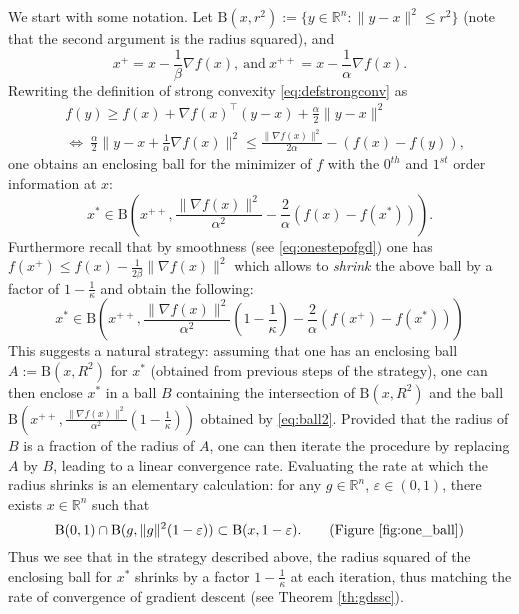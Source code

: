 \documentclass[openany]{now}
\newcommand{\mB}{\mathrm{B}}
\newcommand{\R}{\mathbb{R}}
\renewcommand{\epsilon}{\varepsilon}
\begin{document}
We start with some notation. Let $\mB(x,r^2) := \{y \in \R^n : \|y-x\|^2 \leq r^2 \}$ (note that the second argument is the radius squared), and
$$x^+ = x - \frac{1}{\beta} \nabla f(x), \ \text{and} \ x^{++} = x - \frac{1}{\alpha} \nabla f(x) . $$
Rewriting the definition of strong convexity \eqref{eq:defstrongconv} as
\begin{eqnarray*}
& f(y) \geq f(x) + \nabla f(x)^{\top} (y-x) + \frac{\alpha}{2} \|y-x\|^2 \\
& \Leftrightarrow \ \frac{\alpha}{2} \|y - x + \frac{1}{\alpha} \nabla f(x) \|^2 \leq \frac{\|\nabla f(x)\|^2}{2 \alpha} - (f(x) - f(y)),
\end{eqnarray*}
one obtains an enclosing ball for the minimizer of $f$ with the $0^{th}$ and $1^{st}$ order information at $x$:
$$x^* \in \mB\left(x^{++}, \frac{\|\nabla f(x)\|^2}{\alpha^2} - \frac{2}{\alpha} (f(x) - f(x^*)) \right) .$$
Furthermore recall that by smoothness (see \eqref{eq:onestepofgd}) one has $f(x^+) \leq f(x) - \frac{1}{2 \beta} \|\nabla f(x)\|^2$ which allows to \emph{shrink} the above ball by a factor of $1-\frac{1}{\kappa}$ and obtain the following:
\begin{equation} \label{eq:ball2}
x^* \in \mB\left(x^{++}, \frac{\|\nabla f(x)\|^2}{\alpha^2} \left(1 - \frac{1}{\kappa}\right) - \frac{2}{\alpha} (f(x^+) - f(x^*)) \right) 
\end{equation}
This suggests a natural strategy: assuming that one has an enclosing ball $A:=\mB(x,R^2)$ for $x^*$ (obtained from previous steps of the strategy), one can then enclose $x^*$ in a ball $B$ containing the intersection of $\mB(x,R^2)$ and the ball $\mB\left(x^{++}, \frac{\|\nabla f(x)\|^2}{\alpha^2} \left(1 - \frac{1}{\kappa}\right)\right)$ obtained by \eqref{eq:ball2}. Provided that the radius of $B$ is a fraction of the radius of $A$, one can then iterate the procedure by replacing $A$ by $B$, leading to a linear convergence rate. Evaluating  the rate at which the radius shrinks is an elementary calculation: for any $g \in \R^n$, $\epsilon \in (0,1)$, there exists $x \in \R^n$ such that
$$\mB(0,1) \cap \mB(g, \|g\|^2 (1- \epsilon)) \subset \mB(x, 1-\epsilon) . \quad \quad \text{(Figure \ref{fig:one_ball})}$$
Thus we see that in the strategy described above, the radius squared of the enclosing ball for $x^*$ shrinks by a factor $1 - \frac{1}{\kappa}$ at each iteration, thus matching the rate of convergence of gradient descent (see Theorem \ref{th:gdssc}).
\end{document}
